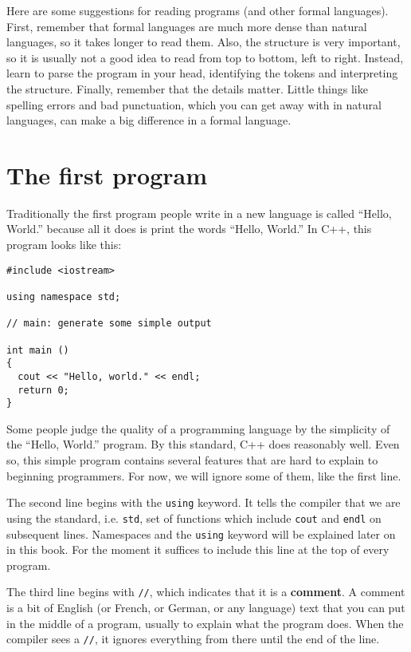 Here are some suggestions for reading programs (and other formal
languages).  First, remember that formal languages are much more dense
than natural languages, so it takes longer to read them.  Also, the
structure is very important, so it is usually not a good idea to read
from top to bottom, left to right.  Instead, learn to parse the
program in your head, identifying the tokens and interpreting the
structure.  Finally, remember that the details matter.  Little things
like spelling errors and bad punctuation, which you can get away
with in natural languages, can make a big difference in a formal
language.

\section{The first program}
\label{hello}

Traditionally the first program people write in a new language
is called ``Hello, World.'' because all it does is print the
words ``Hello, World.''  In C++, this program looks like this:

\begin{lstlisting}
#include <iostream>

using namespace std;

// main: generate some simple output

int main ()
{
  cout << "Hello, world." << endl;
  return 0;
}
\end{lstlisting}
%
Some people judge the quality of a programming language by
the simplicity of the ``Hello, World.'' program.  By this
standard, C++ does reasonably well.  Even so, this simple
program contains several features that are hard to explain to
beginning programmers.  For now, we will ignore some of
them, like the first line.


The second line begins with the {\tt using} keyword.  It tells the compiler that we are using the standard, i.e. {\tt std}, set of functions which include {\tt cout} and {\tt endl} on subsequent lines.  Namespaces and the {\tt using} keyword will be explained later on in this book.  For the moment it suffices to include this line at the top of every program.

The third line begins with {\tt //}, which indicates
that it is a {\bf comment}.  A comment is a bit of
English (or French, or German, or any language) text that you can put in the middle of a program,
usually to explain what the program does.  When the compiler
sees a {\tt //}, it ignores everything from there until the end
of the line.


